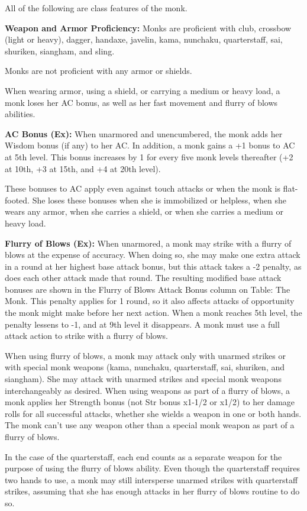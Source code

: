 All of the following are class features of the monk.

\textbf{Weapon and Armor Proficiency:} Monks are proficient with club, crossbow 
(light or heavy), dagger, handaxe, javelin, kama, nunchaku, quarterstaff, sai, 
shuriken, siangham, and sling.

Monks are not proficient with any armor or shields.

When wearing armor, using a shield, or carrying a medium or heavy load, a monk 
loses her AC bonus, as well as her fast movement and flurry of blows abilities.

\textbf{AC Bonus (Ex):} When unarmored and unencumbered, the monk adds her Wisdom 
bonus (if any) to her AC. In addition, a monk gains a +1 bonus to AC at 5th level. 
This bonus increases by 1 for every five monk levels thereafter (+2 at 10th, +3 
at 15th, and +4 at 20th level).

These bonuses to AC apply even against touch attacks or when the monk is flat-footed. 
She loses these bonuses when she is immobilized or helpless, when she wears any 
armor, when she carries a shield, or when she carries a medium or heavy load.

\textbf{Flurry of Blows (Ex):} When unarmored, a monk may strike with a flurry 
of blows at the expense of accuracy. When doing so, she may make one extra attack 
in a round at her highest base attack bonus, but this attack takes a -2 penalty, 
as does each other attack made that round. The resulting modified base attack bonuses 
are shown in the Flurry of Blows Attack Bonus column on Table: The Monk. This penalty 
applies for 1 round, so it also affects attacks of opportunity the monk might make 
before her next action. When a monk reaches 5th level, the penalty lessens to -1, 
and at 9th level it disappears. A monk must use a full attack action to strike 
with a flurry of blows.

When using flurry of blows, a monk may attack only with unarmed strikes or with 
special monk weapons (kama, nunchaku, quarterstaff, sai, shuriken, and siangham). 
She may attack with unarmed strikes and special monk weapons interchangeably as 
desired. When using weapons as part of a flurry of blows, a monk applies her Strength 
bonus (not Str bonus x1-1/2 or x1/2) to her damage rolls for all successful 
attacks, whether she wields a weapon in one or both hands. The monk can't use any 
weapon other than a special monk weapon as part of a flurry of blows.

In the case of the quarterstaff, each end counts as a separate weapon for the purpose 
of using the flurry of blows ability. Even though the quarterstaff requires two 
hands to use, a monk may still intersperse unarmed strikes with quarterstaff strikes, 
assuming that she has enough attacks in her flurry of blows routine to do so. 

